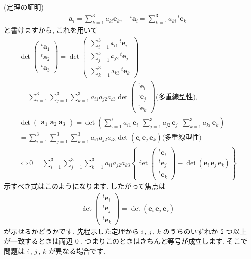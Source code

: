 \documentclass[openany, a4paper, oneside]{jsbook}
\begin{document}
(定理の証明)
\begin{align}
    \bm{a}_{i} = \sum_{k=1}^3 a_{k i} \bm{e}_{k} ,
    \quad
    ^{t}\bm{a}_{i} = \sum_{k=1}^3 a_{k i} \, ^{t}\bm{e}_{k}
\end{align}
と書けますから, これを用いて
\begin{gather}
    \det \begin{pmatrix} ^{t}\bm{a}_1 \\ ^{t}\bm{a}_2 \\ ^{t}\bm{a}_3 \end{pmatrix}
    =  \det \begin{pmatrix} \sum_{i=1}^3 a_{i1} \, ^{t}\bm{e}_{i} \\ \sum_{j=1}^3 a_{j2} \, ^{t}\bm{e}_j
    \\ \sum_{k=1}^3 a_{k3} \, ^{t}\bm{e}_{k} \end{pmatrix} \\
    = \sum_{i=1}^3 \sum_{j=1}^3 \sum_{k=1}^3 a_{i1} a_{j2} a_{k3}
        \det \begin{pmatrix} ^{t}\bm{e}_{i} \\ ^{t}\bm{e}_{j} \\ ^{t}\bm{e}_{k} \end{pmatrix}\text{(多重線型性)} ,\\
    \det \begin{pmatrix} \bm{a}_1 \,\, \bm{a}_2 \,\, \bm{a}_3 \end{pmatrix}
    = \det \left (  \sum_{i=1}^3 a_{i1} \, \bm{e}_{i}  \,\,\,  \sum_{j=1}^3 a_{j2} \, \bm{e}_{j}
            \,\,\,  \sum_{k=1}^3 a_{k i} \, \bm{e}_{k}  \right) \\
    = \sum_{i=1}^3 \sum_{j=1}^3 \sum_{k=1}^3 a_{i1} a_{j2} a_{k3}
        \det \left ( \bm{e}_{i} \, \bm{e}_{j} \, \bm{e}_{k} \right) \text{(多重線型性)}  \\
    \Longleftrightarrow
    0 = \sum_{i=1}^3 \sum_{j=1}^3 \sum_{k=1}^3 a_{i1} a_{j2} a_{k3}
                                \left \{            \det \begin{pmatrix}
                                                    ^{t}\bm{e}_{i} \\ ^{t}\bm{e}_{j} \\ ^{t}\bm{e}_{k}
                                                 \end{pmatrix}
                                            -\det \left ( \bm{e}_{i} \, \bm{e}_{j} \, \bm{e}_{k} \right)
                                \right \}
\end{gather}
示すべき式はこのようになります. したがって焦点は
\begin{align}
    \det \begin{pmatrix} ^{t}\bm{e}_{i} \\ ^{t}\bm{e}_{j} \\ ^{t}\bm{e}_{k} \end{pmatrix}
    =
    \det \left ( \bm{e}_{i} \, \bm{e}_{j} \, \bm{e}_{k} \right)
\end{align}
が示せるかどうかです. 先程示した定理から $i\, , \,j \, , \, k$ のうちのいずれか 2 つ以上が一致するときは両辺 $0$ ,
つまりこのときはきちんと等号が成立します.
そこで問題は $i\, , \,j \, , \, k$ が異なる場合です.
\end{document}
